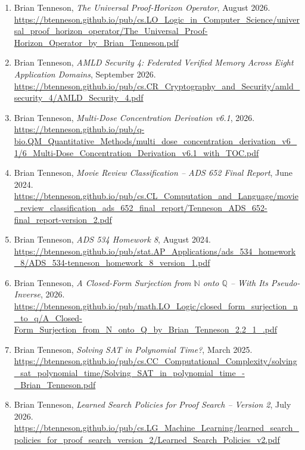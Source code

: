 \documentclass[11pt]{article}
\theoremstyle{special}
\theoremstyle{definition}
\newcommand{\Nat}{\mathbb N}
\newcommand{\Rat}{\mathbb Q}
\begin{document}
\begin{enumerate}[leftmargin=2em]
\item Brian Tenneson, \emph{The Universal Proof-Horizon Operator}, August 2026.\\
\url{https://btenneson.github.io/pub/cs.LO_Logic_in_Computer_Science/universal_proof_horizon_operator/The_Universal_Proof-Horizon_Operator_by_Brian_Tenneson.pdf}

\item Brian Tenneson, \emph{AMLD Security 4: Federated Verified Memory Across Eight Application Domains}, September 2026.\\
\url{https://btenneson.github.io/pub/cs.CR_Cryptography_and_Security/amld_security_4/AMLD_Security_4.pdf}

\item Brian Tenneson, \emph{Multi-Dose Concentration Derivation v6.1}, 2026.\\
\url{https://btenneson.github.io/pub/q-bio.QM_Quantitative_Methods/multi_dose_concentration_derivation_v6_1/6_Multi-Dose_Concentration_Derivation_v6.1_with_TOC.pdf}

\item Brian Tenneson, \emph{Movie Review Classification -- ADS 652 Final Report}, June 2024.\\
\url{https://btenneson.github.io/pub/cs.CL_Computation_and_Language/movie_review_classification_ads_652_final_report/Tenneson_ADS_652-final_report-version_2.pdf}

\item Brian Tenneson, \emph{ADS 534 Homework 8}, August 2024.\\
\url{https://btenneson.github.io/pub/stat.AP_Applications/ads_534_homework_8/ADS_534-tenneson_homework_8_version_1.pdf}

\item Brian Tenneson, \emph{A Closed-Form Surjection from $\Nat$ onto $\Rat$ -- With Its Pseudo-Inverse}, 2026.\\
\url{https://btenneson.github.io/pub/math.LO_Logic/closed_form_surjection_n_to_q/A_Closed-Form_Surjection_from_N_onto_Q_by_Brian_Tenneson_2.2_1_.pdf}

\item Brian Tenneson, \emph{Solving SAT in Polynomial Time?}, March 2025.\\
\url{https://btenneson.github.io/pub/cs.CC_Computational_Complexity/solving_sat_polynomial_time/Solving_SAT_in_polynomial_time_-_Brian_Tenneson.pdf}

\item Brian Tenneson, \emph{Learned Search Policies for Proof Search -- Version 2}, July 2026.\\
\url{https://btenneson.github.io/pub/cs.LG_Machine_Learning/learned_search_policies_for_proof_search_version_2/Learned_Search_Policies_v2.pdf}


\end{enumerate}
\end{document}
